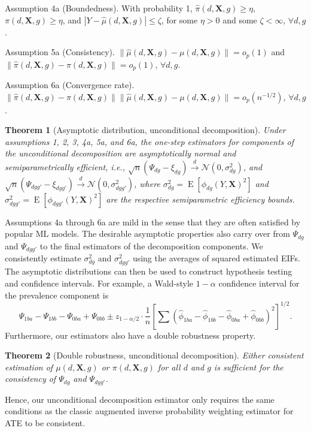 \documentclass[12pt,a4paper]{article}
\newtheorem{prop}{Theorem}
\newcommand{\E}{\operatorname{E}}
\def\X{{\boldsymbol X}}
\begin{document}
Assumption 4a (Boundedness). With probability 1, $\hat{\pi}(d,\X,g) \geq \eta$, $\pi(d,\X,g) \geq \eta$, and $|Y-\hat{\mu}(d,\X,g)| \leq \zeta$, for some $\eta>0$ and some $\zeta < \infty$, $\forall d, g$.

Assumption 5a (Consistency).  $\| \hat{\mu}(d,\X,g) - \mu(d,\X,g) \| =o_p(1)$ and $\| \hat{\pi}(d,\X,g) - \pi(d,\X,g) \| =o_p(1)$, $\forall d, g$.

Assumption 6a (Convergence rate).  $\|\hat{\pi}(d,\X,g)-\pi(d,\X,g)\| \|\hat{\mu}(d,\X,g)-\mu(d,\X,g)\|=o_p(n^{-1/2})$, $\forall d, g$.

\begin{prop}[Asymptotic distribution, unconditional decomposition]
Under assumptions 1, 2, 3, 4a, 5a, and 6a, the one-step estimators for components of the unconditional decomposition are asymptotically normal and semiparametrically efficient, i.e., $\sqrt{n}(\Psi_{dg} - \xi_{dg}) \xrightarrow{d} \mathcal{N}(0, \sigma^2_{dg})$, and $\sqrt{n}(\Psi_{dgg'} - \xi_{dgg'}) \xrightarrow{d} \mathcal{N}(0, \sigma^2_{dgg'})$, where $\sigma^2_{dg}=\E[\phi_{dg}(Y,\X)^2]$ and $\sigma^2_{dgg'}=\E[\phi_{dgg'}(Y,\X)^2]$ are the respective semiparametric efficiency bounds. 
\end{prop}
Assumptions 4a through 6a are mild in the sense that they are often satisfied by popular ML models. The desirable asymptotic properties also carry over from $\Psi_{dg}$ and $\Psi_{dgg'}$ to the final estimators of the decomposition components. We consistently estimate $\sigma^2_{dg}$ and $\sigma^2_{dgg'}$ using the  averages of squared estimated EIFs. The asymptotic distributions can then be used to construct hypothesis testing and confidence intervals. For example, a Wald-style $1-\alpha$ confidence interval for the prevalence component is $$\Psi_{1ba}-\Psi_{1bb}-\Psi_{0ba}+\Psi_{0bb} \pm z_{1-\alpha/2} \cdot \frac{1}{n} \left[\sum  \left(\hat{\phi}_{1ba}-\hat{\phi}_{1bb}-  \hat{\phi}_{0ba}+\hat{\phi}_{0bb}\right)^2 \right]^{1/2}.$$ Furthermore, our estimators also have a double robustness property. 

\begin{prop}[Double robustness, unconditional decomposition]
Either consistent estimation of $\mu(d,\X,g)$ or $\pi(d,\X,g)$ for all $d$ and $g$ is sufficient for the consistency of $\Psi_{dg}$ and $\Psi_{dgg'}$.  
\end{prop}
Hence, our unconditional decomposition estimator only requires the same conditions as the classic augmented inverse probability weighting estimator for ATE \citep{robins_estimation_1994, hirano_efficient_2003} to be consistent. 
\end{document}
